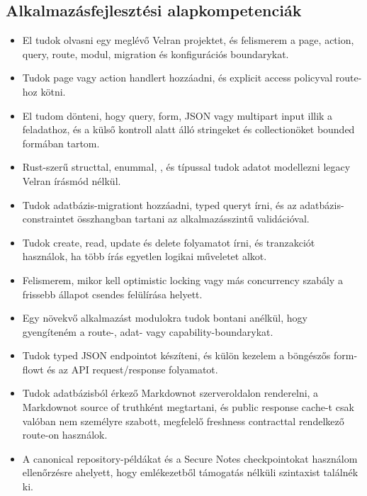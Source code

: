 \subsection*{Alkalmazásfejlesztési alapkompetenciák}
\begin{itemize}[label={\texttt{[ ]}},leftmargin=2em]
  \item El tudok olvasni egy meglévő Velran projektet, és felismerem a page, action, query, route, modul, migration és konfigurációs boundarykat.
  \item Tudok page vagy action handlert hozzáadni, és explicit access policyval route-hoz kötni.
  \item El tudom dönteni, hogy query, form, JSON vagy multipart input illik a feladathoz, és a külső kontroll alatt álló stringeket és collectionöket bounded formában tartom.
  \item Rust-szerű structtal, enummal, ,  és  típussal tudok adatot modellezni legacy Velran írásmód nélkül.
  \item Tudok adatbázis-migrationt hozzáadni, typed queryt írni, és az adatbázis-constraintet összhangban tartani az alkalmazásszintű validációval.
  \item Tudok create, read, update és delete folyamatot írni, és tranzakciót használok, ha több írás egyetlen logikai műveletet alkot.
  \item Felismerem, mikor kell optimistic locking vagy más concurrency szabály a frissebb állapot csendes felülírása helyett.
  \item Egy növekvő alkalmazást modulokra tudok bontani anélkül, hogy gyengíteném a route-, adat- vagy capability-boundarykat.
  \item Tudok typed JSON endpointot készíteni, és külön kezelem a böngészős form-flowt és az API request/response folyamatot.
  \item Tudok adatbázisból érkező Markdownot szerveroldalon renderelni, a Markdownot source of truthként megtartani, és public response cache-t csak valóban nem személyre szabott, megfelelő freshness contracttal rendelkező route-on használok.
  \item A canonical repository-példákat és a Secure Notes checkpointokat használom ellenőrzésre ahelyett, hogy emlékezetből támogatás nélküli szintaxist találnék ki.
\end{itemize}

